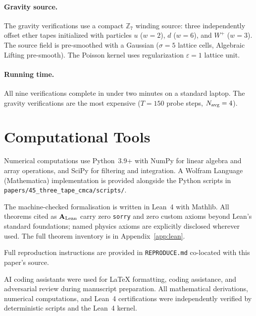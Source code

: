 \documentclass[11pt]{article}
\theoremstyle{remark}
\newcommand{\CatAL}{\ensuremath{\textbf{A}_{\rm Lean}}}
\begin{document}
\begin{appendices}
\paragraph{Gravity source.}
The gravity verifications use a compact $\mathbb{Z}_7$ winding source: three independently
offset ether tapes initialized with particles $u$ ($w=2$), $d$ ($w=6$), and $W^+$ ($w=3$).
The source field is pre-smoothed with a Gaussian ($\sigma=5$ lattice cells, Algebraic
Lifting pre-smooth). The Poisson kernel uses regularization $\varepsilon=1$ lattice unit.

\paragraph{Running time.}
All nine verifications complete in under two minutes on a standard laptop.
The gravity verifications are the most expensive ($T=150$ probe steps, $N_{\rm avg}=4$).

\end{appendices}

\section*{Computational Tools}

Numerical computations use Python~3.9+ with NumPy for linear algebra and
array operations, and SciPy for filtering and integration.
A Wolfram Language (Mathematica) implementation is provided alongside the
Python scripts in \texttt{papers/45\_three\_tape\_cmca/\allowbreak scripts/}.

The machine-checked formalisation is written in Lean~4 with Mathlib.
All theorems cited as $\CatAL$ carry zero \texttt{sorry} and zero custom
axioms beyond Lean's standard foundations; named physics axioms are
explicitly disclosed wherever used. The full theorem inventory is in
Appendix~\ref{app:lean}.

Full reproduction instructions are provided in \texttt{REPRODUCE.md} co-located with this paper's source.

AI coding assistants were used for LaTeX formatting, coding assistance, and adversarial review during manuscript preparation. All mathematical derivations, numerical computations, and Lean~4 certifications were independently verified by deterministic scripts and the Lean~4 kernel.



\end{document}
